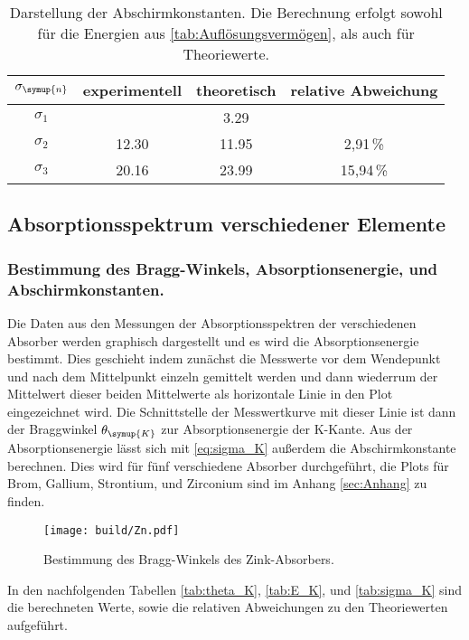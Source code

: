 \begin{table}
  \centering
  \caption{Darstellung der Abschirmkonstanten. Die Berechnung erfolgt sowohl für die Energien aus \autoref{tab:Auflösungsvermögen}, %
  als auch für Theoriewerte.}
  \label{tab:Abschirmkonstanten}
  \begin{tabular}{c S[table-format=2.2] S[table-format=2.2] S[table-format=2.2]}
    \toprule
    {$\sigma_{\symup{n}}$} & {experimentell} & {theoretisch} & {relative Abweichung}\\
    \midrule
    $\sigma_1$  & {}    & 3.29  & {}        \\
    $\sigma_2$  & 12.30 & 11.95 & 2,91\,\%  \\
    $\sigma_3$  & 20.16 & 23.99 & 15,94\,\% \\
    \bottomrule
  \end{tabular}
\end{table}

\subsection{Absorptionsspektrum verschiedener Elemente}
\subsubsection{Bestimmung des Bragg-Winkels, Absorptionsenergie, und Abschirmkonstanten.}
Die Daten aus den Messungen der Absorptionsspektren der verschiedenen Absorber werden graphisch dargestellt und es wird die
Absorptionsenergie bestimmt. Dies geschieht indem zunächst die Messwerte vor dem Wendepunkt und nach dem Mittelpunkt einzeln gemittelt
werden und dann wiederrum der Mittelwert dieser beiden Mittelwerte als horizontale Linie in den Plot eingezeichnet wird. Die Schnittstelle
der Messwertkurve mit dieser Linie ist dann der Braggwinkel $\theta_{\symup{K}}$ zur Absorptionsenergie der K-Kante.
Aus der Absorptionsenergie lässt sich mit \eqref{eq:sigma_K} außerdem die Abschirmkonstante berechnen. Dies wird für fünf verschiedene
Absorber durchgeführt, die Plots für Brom, Gallium, Strontium, und Zirconium sind im Anhang \ref{sec:Anhang} zu finden.

\begin{figure}[H]
  \centering
  \texttt{[image: build/Zn.pdf]}
  \caption{Bestimmung des Bragg-Winkels des Zink-Absorbers.}
  \label{fig:Zn}
\end{figure}

In den nachfolgenden Tabellen \ref{tab:theta_K}, \ref{tab:E_K}, und \ref{tab:sigma_K} sind die berechneten Werte, sowie die relativen 
Abweichungen zu den Theoriewerten aufgeführt.

